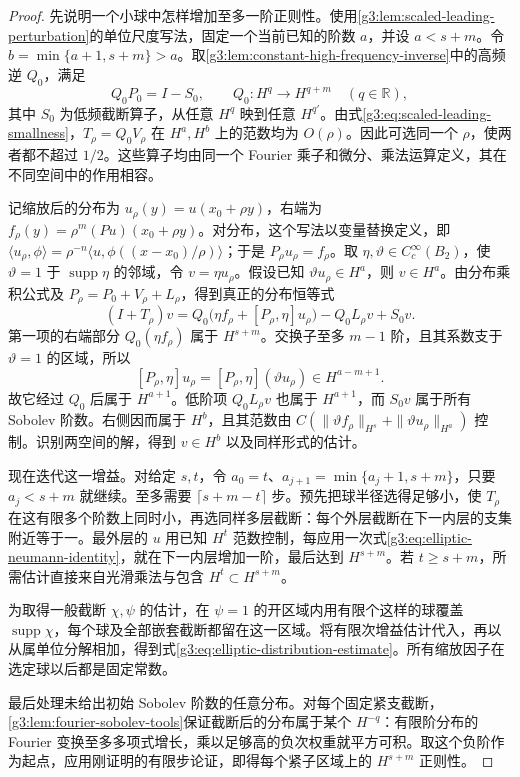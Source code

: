 \begin{proof}
	先说明一个小球中怎样增加至多一阶正则性。使用\cref{g3:lem:scaled-leading-perturbation}的单位尺度写法，固定一个当前已知的阶数 \(a\)，并设 \(a<s+m\)。令
	\(b=\min\{a+1,s+m\}>a\)。取\cref{g3:lem:constant-high-frequency-inverse}中的高频逆 \(Q_0\)，满足
	\[
		Q_0P_0=I-S_0,\qquad
		Q_0:H^q\longrightarrow H^{q+m}\quad(q\in\mathbb R),
	\]
	其中 \(S_0\) 为低频截断算子，从任意 \(H^q\) 映到任意 \(H^{q'}\)。由式\eqref{g3:eq:scaled-leading-smallness}，\(T_\rho=Q_0V_\rho\) 在 \(H^a,H^b\) 上的范数均为 \(O(\rho)\)。因此可选同一个 \(\rho\)，使两者都不超过 \(1/2\)。这些算子均由同一个 Fourier 乘子和微分、乘法运算定义，其在不同空间中的作用相容。

	记缩放后的分布为 \(u_\rho(y)=u(x_0+\rho y)\)，右端为 \(f_\rho(y)=\rho^m(Pu)(x_0+\rho y)\)。对分布，这个写法以变量替换定义，即
	\(\langle u_\rho,\phi\rangle=\rho^{-n}\langle u,\phi((x-x_0)/\rho)\rangle\)；于是 \(P_\rho u_\rho=f_\rho\)。取 \(\eta,\vartheta\in C_c^\infty(B_2)\)，使 \(\vartheta=1\) 于 \(\operatorname{supp}\eta\) 的邻域，令 \(v=\eta u_\rho\)。假设已知 \(\vartheta u_\rho\in H^a\)，则 \(v\in H^a\)。由分布乘积公式及 \(P_\rho=P_0+V_\rho+L_\rho\)，得到真正的分布恒等式
	\begin{equation}\label{g3:eq:elliptic-neumann-identity}
		(I+T_\rho)v
		=Q_0\bigl(\eta f_\rho+[P_\rho,\eta]u_\rho\bigr)
		-Q_0L_\rho v+S_0v.
	\end{equation}
	第一项的右端部分 \(Q_0(\eta f_\rho)\) 属于 \(H^{s+m}\)。交换子至多 \(m-1\) 阶，且其系数支于 \(\vartheta=1\) 的区域，所以
	\[
		[P_\rho,\eta]u_\rho=[P_\rho,\eta](\vartheta u_\rho)
		\in H^{a-m+1}.
	\]
	故它经过 \(Q_0\) 后属于 \(H^{a+1}\)。低阶项 \(Q_0L_\rho v\) 也属于 \(H^{a+1}\)，而 \(S_0v\) 属于所有 Sobolev 阶数。右侧因而属于 \(H^b\)，且其范数由
	\(C(\|\vartheta f_\rho\|_{H^s}+\|\vartheta u_\rho\|_{H^a})\) 控制。识别两空间的解，得到 \(v\in H^b\) 以及同样形式的估计。

	现在迭代这一增益。对给定 \(s,t\)，令 \(a_0=t\)、\(a_{j+1}=\min\{a_j+1,s+m\}\)，只要 \(a_j<s+m\) 就继续。至多需要 \(\lceil s+m-t\rceil\) 步。预先把球半径选得足够小，使 \(T_\rho\) 在这有限多个阶数上同时小，再选同样多层截断：每个外层截断在下一内层的支集附近等于一。最外层的 \(u\) 用已知 \(H^t\) 范数控制，每应用一次式\eqref{g3:eq:elliptic-neumann-identity}，就在下一内层增加一阶，最后达到 \(H^{s+m}\)。若 \(t\ge s+m\)，所需估计直接来自光滑乘法与包含 \(H^t\subset H^{s+m}\)。

	为取得一般截断 \(\chi,\psi\) 的估计，在 \(\psi=1\) 的开区域内用有限个这样的球覆盖 \(\operatorname{supp}\chi\)，每个球及全部嵌套截断都留在这一区域。将有限次增益估计代入，再以从属单位分解相加，得到式\eqref{g3:eq:elliptic-distribution-estimate}。所有缩放因子在选定球以后都是固定常数。

	最后处理未给出初始 Sobolev 阶数的任意分布。对每个固定紧支截断，\cref{g3:lem:fourier-sobolev-tools}保证截断后的分布属于某个 \(H^{-q}\)：有限阶分布的 Fourier 变换至多多项式增长，乘以足够高的负次权重就平方可积。取这个负阶作为起点，应用刚证明的有限步论证，即得每个紧子区域上的 \(H^{s+m}\) 正则性。
\end{proof}

